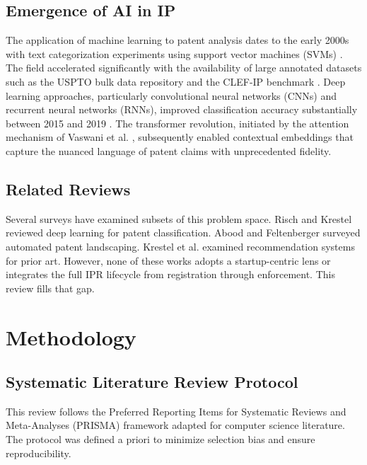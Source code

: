\documentclass[conference]{IEEEtran}
\begin{document}
\subsection{Emergence of AI in IP}

The application of machine learning to patent analysis dates to the early 2000s with text categorization experiments using support vector machines (SVMs) \cite{ref14}. The field accelerated significantly with the availability of large annotated datasets such as the USPTO bulk data repository and the CLEF-IP benchmark \cite{ref15}. Deep learning approaches, particularly convolutional neural networks (CNNs) and recurrent neural networks (RNNs), improved classification accuracy substantially between 2015 and 2019 \cite{ref16}. The transformer revolution, initiated by the attention mechanism of Vaswani et al. \cite{ref17}, subsequently enabled contextual embeddings that capture the nuanced language of patent claims with unprecedented fidelity.

\subsection{Related Reviews}

Several surveys have examined subsets of this problem space. Risch and Krestel \cite{ref18} reviewed deep learning for patent classification. Abood and Feltenberger \cite{ref19} surveyed automated patent landscaping. Krestel et al. \cite{ref20} examined recommendation systems for prior art. However, none of these works adopts a startup-centric lens or integrates the full IPR lifecycle from registration through enforcement. This review fills that gap.

\section{Methodology}

\subsection{Systematic Literature Review Protocol}

This review follows the Preferred Reporting Items for Systematic Reviews and Meta-Analyses (PRISMA) framework \cite{ref21} adapted for computer science literature. The protocol was defined a priori to minimize selection bias and ensure reproducibility.
\end{document}

